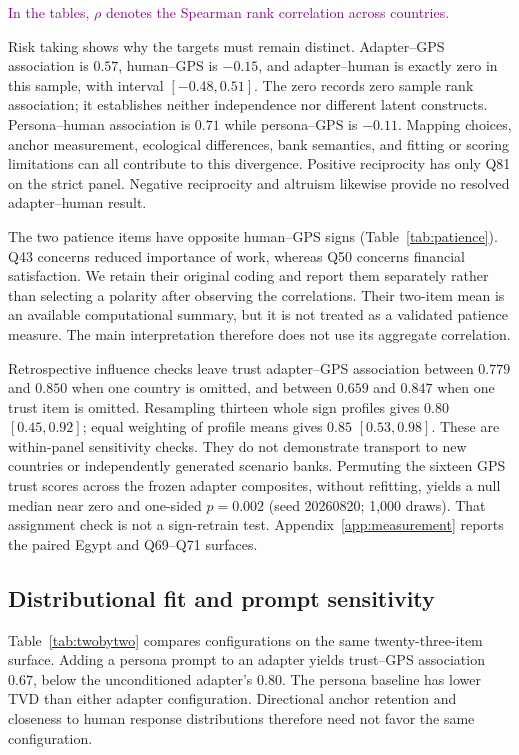\textcolor{purple}{In the tables, $\rho$ denotes the Spearman rank correlation across countries.}


Risk taking shows why the targets must remain distinct. Adapter--GPS association is $0.57$, human--GPS is $-0.15$, and adapter--human is exactly zero in this sample, with interval $[-0.48,0.51]$. The zero records zero sample rank association; it establishes neither independence nor different latent constructs. Persona--human association is $0.71$ while persona--GPS is $-0.11$. Mapping choices, anchor measurement, ecological differences, bank semantics, and fitting or scoring limitations can all contribute to this divergence. Positive reciprocity has only Q81 on the strict panel. Negative reciprocity and altruism likewise provide no resolved adapter--human result.


The two patience items have opposite human--GPS signs (Table~\ref{tab:patience}). Q43 concerns reduced importance of work, whereas Q50 concerns financial satisfaction. We retain their original coding and report them separately rather than selecting a polarity after observing the correlations. Their two-item mean is an available computational summary, but it is not treated as a validated patience measure. The main interpretation therefore does not use its aggregate correlation.

Retrospective influence checks leave trust adapter--GPS association between $0.779$ and $0.850$ when one country is omitted, and between $0.659$ and $0.847$ when one trust item is omitted. Resampling thirteen whole sign profiles gives $0.80$ $[0.45,0.92]$; equal weighting of profile means gives $0.85$ $[0.53,0.98]$. These are within-panel sensitivity checks. They do not demonstrate transport to new countries or independently generated scenario banks. Permuting the sixteen GPS trust scores across the frozen adapter composites, without refitting, yields a null median near zero and one-sided $p=0.002$ (seed 20260820; 1,000 draws). That assignment check is not a sign-retrain test. Appendix~\ref{app:measurement} reports the paired Egypt and Q69--Q71 surfaces.

\subsection{Distributional fit and prompt sensitivity}
Table~\ref{tab:twobytwo} compares configurations on the same twenty-three-item surface. Adding a persona prompt to an adapter yields trust--GPS association $0.67$, below the unconditioned adapter's $0.80$. The persona baseline has lower TVD than either adapter configuration. Directional anchor retention and closeness to human response distributions therefore need not favor the same configuration.


